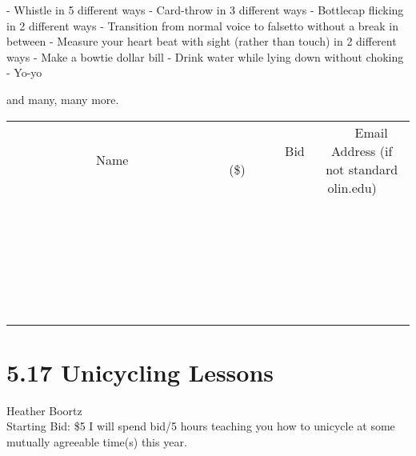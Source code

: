 \documentclass[11pt]{article}
\begin{document}
- Whistle in 5 different ways
- Card-throw in 3 different ways
- Bottlecap flicking in 2 different ways
- Transition from normal voice to falsetto without a break in between
- Measure your heart beat with sight (rather than touch) in 2 different ways
- Make a bowtie dollar bill
- Drink water while lying down without choking
- Yo-yo

and many, many more.
\\[6ex]
\begin{tabular}{c c c}
~~~~~~~~~~~~~Name~~~~~~~~~~~~~ & ~~~~~~~~~Bid (\$)~~~~~~~~~  & ~~~Email Address (if not standard olin.edu)~~~\\
 & & \\
\hline
 & & \\
\hline
 & & \\
\hline
 & & \\
\hline
 & & \\
\hline
 & & \\
\hline
 & & \\
\hline
 & & \\
\hline
 & & \\
\hline
 & & \\
\hline
 & & \\
\hline
 & & \\
\hline
 & & \\
\hline
 & & \\
\hline
 & & \\
\hline
 & & \\
\hline
 & & \\
\hline
 & & \\
\hline
 & & \\
\hline
 & & \\
\hline
 & & \\
\hline
 & & \\
\hline
 & & \\
\hline
 & & \\
\hline
 & & \\
\hline
 & & \\
\hline
\end{tabular}
\newpage
\section*{5.17 Unicycling Lessons}
Heather Boortz
\\
Starting Bid: \$5
\newline
I will spend bid/5 hours teaching you how to unicycle at some mutually agreeable time(s) this year. 
\end{document}
